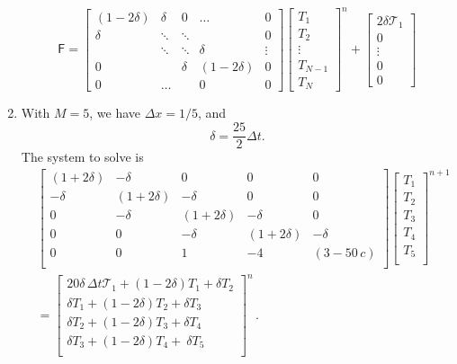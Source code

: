 \documentclass[11pt]{article}
\newcommand{\per}{\, .}
\def\beq{\begin{equation}}
\def\eeq{\end{equation}}
\begin{document}
\begin{enumerate}[label=(\alph*)]
\beq
\mathsf{F} = \left[ \begin{matrix}
        (1-2\delta) & \delta &0 &\ldots &0\\
        \delta & \ddots & \ddots & &0\\
               & \ddots &\ddots & \delta &\vdots\\
        0 & & \delta & (1-2\delta)&0\\
0 & \ldots&  & 0 &0\end{matrix} \right]
 \left[ \begin{matrix}
         T_1\\
         T_2\\
         \vdots\\
         T_{N-1}\\
         T_N
 \end{matrix} \right]^{n} +
 \left[ \begin{matrix}
         2\delta \mathcal{T}_1\\
         0\\
         \vdots\\
         0\\
         0
 \end{matrix} \right]
\eeq

    \item With $M = 5$, we have $\Delta x = 1/5$, and
        \beq
            \delta = \frac{25}{2}\Delta t.
        \eeq
        The system to solve is
\begin{align} \label{matrixM}
    & \left[ \begin{matrix}
            (1+2\delta) & -\delta & 0 & 0 & 0\\
            -\delta & (1+2\delta)  & -\delta & 0 &0\\
             0& -\delta & (1+2\delta)  & -\delta & 0\\
              0&  0& -\delta & (1+2\delta)  & -\delta \\
             0&  0& 1 & -4  & (3-50\,c) \\
           \end{matrix} \right]
           \left[ \begin{matrix}
         T_1\\
         T_2\\
         T_3\\
         T_4\\
         T_5\\
 \end{matrix} \right]^{n+1}\\ &=
 \left[ \begin{matrix}
         20\delta\,\Delta t \mathcal{T}_1 + (1 -2\delta)T_1 + \delta T_2 \\
         \delta T_1+  (1 -2\delta)T_2 + \delta T_3\\
         \delta T_2+  (1 -2\delta)T_3 +  \delta T_4\\
         \delta T_3+  (1 -2\delta)T_4 + \ \delta T_5\\
 \end{matrix} \right]^n\per
\end{align}




\end{enumerate}
\end{document}
